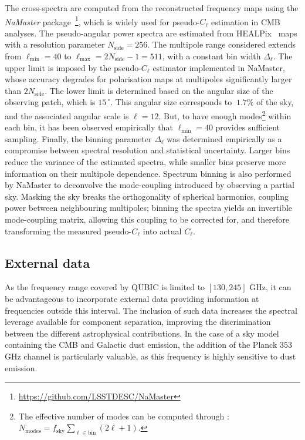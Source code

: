 \documentclass[../../thesis.tex]{subfiles}
\begin{document}
The cross-spectra are computed from the reconstructed frequency maps using the \emph{NaMaster} package~\cite{alonso2019}\footnote{\url{https://github.com/LSSTDESC/NaMaster}}, which is widely used for pseudo-$C_\ell$ estimation in CMB analyses. The pseudo-angular power spectra are estimated from HEALPix~\cite{healpix2005} maps with a resolution parameter $N_{\mathrm{side}} = 256$.
The multipole range considered extends from $\ell_{\mathrm{min}} = 40$ to $\ell_{\mathrm{max}} = 2N_{\mathrm{side}} - 1 = 511$, with a constant bin width $\Delta_\ell$. The upper limit is imposed by the pseudo-$C_\ell$ estimator implemented in NaMaster, whose accuracy degrades for polarisation maps at multipoles significantly larger than $2N_{\mathrm{side}}$. The lower limit is determined based on the angular size of the observing patch, which is $15^{~\circ}$. This angular size corresponds to $~1.7\%$ of the sky, and the associated angular scale is $\ell = 12$. But, to have enough modes\footnote{The effective number of modes can be computed through : $N_{\text{modes}} = f_{\text{sky}} \sum_{\ell\in \text{bin}}\left(2\ell+1\right)$.} within each bin, it has been observed empirically that $\ell_{\mathrm{min}} = 40$ provides sufficient sampling.
Finally, the binning parameter $\Delta_\ell$ was determined empirically as a compromise between spectral resolution and statistical uncertainty. Larger bins reduce the variance of the estimated spectra, while smaller bins preserve more information on their multipole dependence. Spectrum binning is also performed by NaMaster to deconvolve the mode-coupling introduced by observing a partial sky. Masking the sky breaks the orthogonality of spherical harmonics, coupling power between neighbouring multipoles; binning the spectra yields an invertible mode-coupling matrix, allowing this coupling to be corrected for, and therefore transforming the measured pseudo-$C_\ell$ into actual $C_\ell$.

\subsection{External data}

As the frequency range covered by QUBIC is limited to $\left[130,245\right]$ GHz, it can be advantageous to incorporate external data providing information at frequencies outside this interval. The inclusion of such data increases the spectral leverage available for component separation, improving the discrimination between the different astrophysical contributions. In the case of a sky model containing the CMB and Galactic dust emission, the addition of the Planck $353$ GHz channel is particularly valuable, as this frequency is highly sensitive to dust emission.
\end{document}
